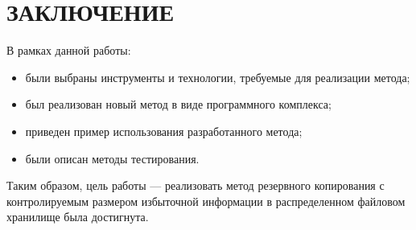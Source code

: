 \chapter*{ЗАКЛЮЧЕНИЕ}

\begin{flushleft}
В рамках данной работы:
\end{flushleft}
\begin{itemize}
\item были выбраны инструменты и технологии, требуемые для реализации метода;
\item был реализован новый метод в виде программного комплекса;
\item приведен пример использования разработанного метода;
\item были описан методы тестирования.
\end{itemize}

Таким образом, цель работы --- реализовать метод резервного копирования с контролируемым размером избыточной информации в распределенном файловом хранилище была достигнута.